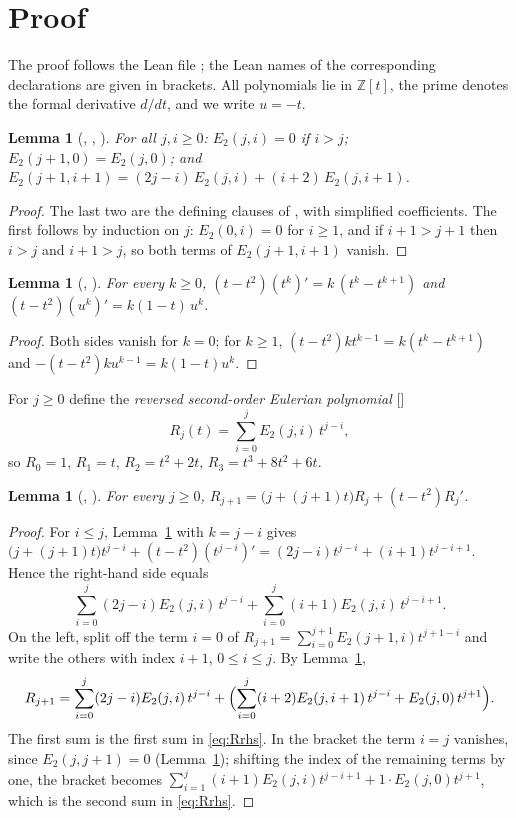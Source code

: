\documentclass[11pt]{amsart}
\theoremstyle{plain}
\newtheorem{lemma}[theorem]{Lemma}
\theoremstyle{definition}
\newcommand{\Z}{\mathbb{Z}}
\newcommand{\Et}{E_2}
\begin{document}
\section{Proof}\label{sec:proof}

The proof follows the Lean file ; the Lean names of the corresponding declarations are given in brackets. All polynomials lie in $\Z[t]$, the prime denotes the formal derivative $d/dt$, and we write $u=-t$.

\begin{lemma}[, , ]\label{lem:E2}
For all $j,i\ge0$: $\Et(j,i)=0$ if $i>j$; $\Et(j+1,0)=\Et(j,0)$; and
$\Et(j+1,i+1)=(2j-i)\,\Et(j,i)+(i+2)\,\Et(j,i+1)$.
\end{lemma}

\begin{proof}
The last two are the defining clauses of , with simplified coefficients. The first follows by induction on $j$: $\Et(0,i)=0$ for $i\ge1$, and if $i+1>j+1$ then $i>j$ and $i+1>j$, so both terms of $\Et(j+1,i+1)$ vanish.
\end{proof}

\begin{lemma}[, ]\label{lem:deriv}
For every $k\ge0$, $(t-t^2)(t^k)'=k\,(t^k-t^{k+1})$ and $(t-t^2)(u^k)'=k(1-t)\,u^k$.
\end{lemma}
\begin{proof}
Both sides vanish for $k=0$; for $k\ge1$, $(t-t^2)kt^{k-1}=k(t^k-t^{k+1})$ and $-(t-t^2)ku^{k-1}=k(1-t)u^k$.
\end{proof}

For $j\ge0$ define the \emph{reversed second-order Eulerian polynomial} []
\[
  R_j(t)=\sum_{i=0}^{j}\Et(j,i)\,t^{j-i},
\]
so $R_0=1$, $R_1=t$, $R_2=t^2+2t$, $R_3=t^3+8t^2+6t$.

\begin{lemma}[, ]\label{lem:R}
For every $j\ge0$, $R_{j+1}=\bigl(j+(j+1)t\bigr)R_j+(t-t^2)R_j'$.
\end{lemma}

\begin{proof}
For $i\le j$, Lemma~\ref{lem:deriv} with $k=j-i$ gives $\bigl(j+(j+1)t\bigr)t^{j-i}+(t-t^2)(t^{j-i})'=(2j-i)t^{j-i}+(i+1)t^{j-i+1}$. Hence the right-hand side equals
\begin{equation}\label{eq:Rrhs}
  \sum_{i=0}^{j}(2j-i)\Et(j,i)\,t^{j-i}+\sum_{i=0}^{j}(i+1)\Et(j,i)\,t^{j-i+1}.
\end{equation}
On the left, split off the term $i=0$ of $R_{j+1}=\sum_{i=0}^{j+1}\Et(j+1,i)t^{j+1-i}$ and write the others with index $i+1$, $0\le i\le j$. By Lemma~\ref{lem:E2},
\[
  R_{j+1}=\sum_{i=0}^{j}(2j-i)\Et(j,i)\,t^{j-i}+\Bigl(\sum_{i=0}^{j}(i+2)\Et(j,i+1)\,t^{j-i}+\Et(j,0)\,t^{j+1}\Bigr).
\]
The first sum is the first sum in \eqref{eq:Rrhs}. In the bracket the term $i=j$ vanishes, since $\Et(j,j+1)=0$ (Lemma~\ref{lem:E2}); shifting the index of the remaining terms by one, the bracket becomes $\sum_{i=1}^{j}(i+1)\Et(j,i)t^{j-i+1}+1\cdot\Et(j,0)t^{j+1}$, which is the second sum in \eqref{eq:Rrhs}.
\end{proof}
\end{document}

